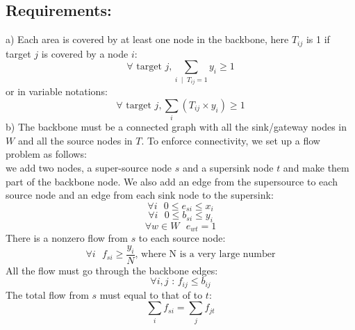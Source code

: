 \documentclass[letterpaper, 12pt]{article}
\begin{document}
\subsection*{Requirements: }a) Each area is covered by at least one node in the
backbone, here $T_{ij}$ is 1 if target $j$ is covered by a node $i$:
\begin{equation}
	\forall \mbox{ target }j,    \sum_{i \; \mid \; T_{ij} = 1}   y_i   \geq   1
\end{equation}
or in variable notations:
\begin{equation*}
	\forall \mbox{ target }j,    \sum_i   (T_{ij} \times y_i)   \geq   1
\end{equation*}
b) The backbone must be a connected graph with all the sink/gateway nodes in $W$
and all the source nodes in $T$. To enforce connectivity, we set up a flow problem
as follows: \\
\indent we add two nodes, a super-source node $s$ and a supersink node $t$
and make them part of the backbone node. We also add an edge from the supersource to
each source node and an edge from each sink node to the supersink:
\begin{equation}
	\forall i\mbox{ } 0 \leq  e_{si} \leq x_i
\end{equation}
\begin{equation}
	\forall i\mbox{ } 0 \leq b_{si} \leq y_i
\end{equation}
\begin{equation}
 	\forall w \in W\mbox{ } e_{wt} = 1
\end{equation}
{%
There is a nonzero flow from $s$ to each source
node:
\begin{equation}
	\forall i \mbox{ }f_{si} \geq \frac{y_{i}}{N} \mbox{, where N is a very large
	number}
\end{equation}
}
All the flow must go through the backbone edges:
\begin{equation}
	\forall i,j \mbox{ : }f_{ij} \leq b_{ij}
\end{equation}
The total flow from $s$ must equal to that of to $t$:
\begin{equation}
	\sum_i f_{si} = \sum_j f_{jt}
\end{equation} 
\end{document}
